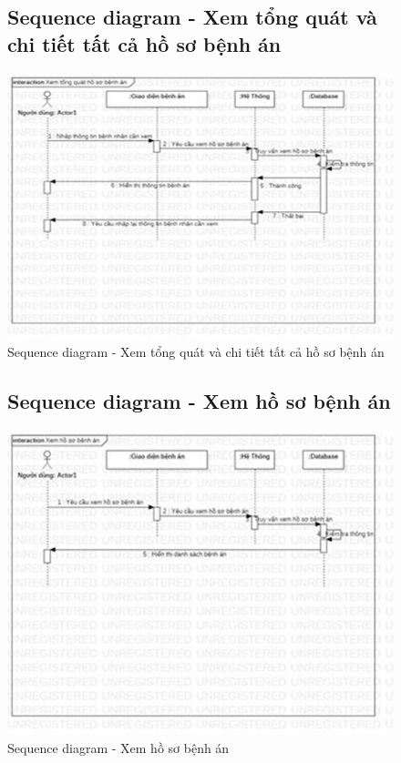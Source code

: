\documentclass{report}
\begin{document}
\begin{center}
	\begin{figure}[!htp]
		\subsection{Sequence diagram - Xem tổng quát và chi tiết tất cả hồ sơ bệnh án}
		\begin{center}
			\includegraphics[scale=1]{Hinh/Sequence diagram Xem tổng quát và chi tiết tất cả hồ sơ bệnh án.png}
		\end{center}
		\caption{Sequence diagram - Xem tổng quát và chi tiết tất cả hồ sơ bệnh án}
	\end{figure}
\end{center}

\pagebreak
\begin{center}
	\begin{figure}[!htp]
		\subsection{Sequence diagram - Xem hồ sơ bệnh án}
		\begin{center}
			\includegraphics[scale=1]{Hinh/Sequence diagram Xem hồ sơ bệnh án.png}
		\end{center}
		\caption{Sequence diagram - Xem hồ sơ bệnh án}
	\end{figure}
\end{center}
\end{document}
